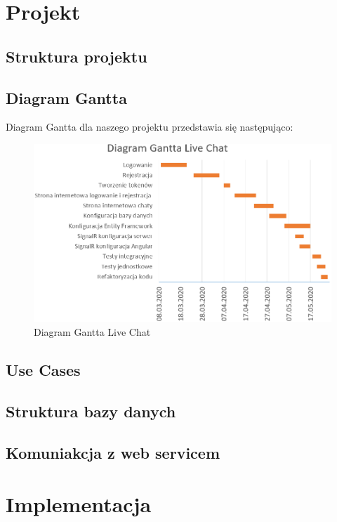 \documentclass[12pt,a4paper]{article}
\begin{document}
\section{Projekt}

\subsection{Struktura projektu}			%
\subsection{Diagram Gantta}				%

\hspace*{0.7cm} Diagram Gantta dla naszego projektu przedstawia się następująco:

\begin{figure}[h]
	\centering
	\includegraphics[width=1\linewidth]{diagramGantta}
	\caption{Diagram Gantta Live Chat}
	\label{fig:diagramgantta}
\end{figure}


\subsection{Use Cases}					%
\subsection{Struktura bazy danych}  	%
\subsection{Komuniakcja z web servicem} %

\section{Implementacja}
\end{document}
